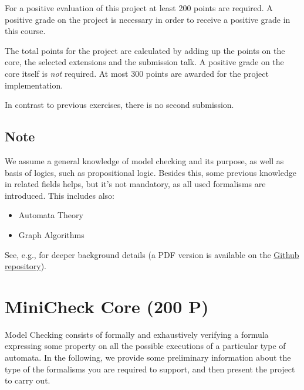 \documentclass{article}
\begin{document}
For a positive evaluation of this project at least 200 points are required. 
A positive grade on the project is necessary in order to receive a positive grade in this course. 

The total points for the project are calculated by adding up the points on the core, 
the selected extensions and the submission talk. A positive grade on the core itself is \textit{not} required. 
At most 300 points are awarded for the project implementation.

In contrast to previous exercises, there is no second submission.

\subsection{Note}
We assume a general knowledge of model checking and its purpose, as well as basis of logics,
such as propositional logic.  Besides this, some previous knowledge in related fields helps, but it's not mandatory,
as all used formalisms are introduced. 
This includes also:
\begin{itemize}
    \item Automata Theory
    \item Graph Algorithms
\end{itemize}
See, e.g., \cite{BaKa} for deeper background details (a PDF version is available on the 
\href{https://github.com/francescopont/MiniCheck.git}{Github repository}).

\section{MiniCheck Core (200 P)}

Model Checking consists of formally and exhaustively verifying a formula expressing some property
on all the possible executions of a particular type of automata. 
In the following, we provide some preliminary information 
about the type of the formalisms you are required to support, 
and then present the project to carry out. 
\end{document}
